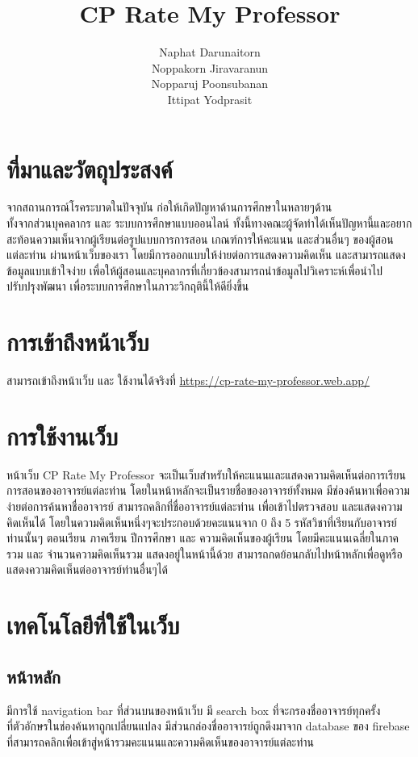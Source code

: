 \documentclass[17pt]{extarticle}
\title{\huge\textbf{CP Rate My Professor}}
\author{Naphat Darunaitorn\\ Noppakorn Jiravaranun\\ Nopparuj Poonsubanan\\ Ittipat Yodprasit}
\begin{document}
\maketitle
\pagebreak
\tableofcontents
\pagebreak
\section{ที่มาและวัตถุประสงค์}

จากสถานการณ์โรคระบาดในปัจจุบัน ก่อให้เกิดปัญหาด้านการศึกษาในหลายๆด้าน\\
ทั้งจากส่วนบุคคลากร และ ระบบการศึกษาแบบออนไลน์
ทั้งนี้ทางคณะผู้จัดทำได้เห็นปัญหานี้และอยากสะท้อนความเห็นจากผู้เรียนต่อรูปแบบการการสอน
เกณฑ์การให้คะแนน และส่วนอื่นๆ ของผู้สอนแต่ละท่าน ผ่านหน้าเว็บของเรา
โดยมีการออกแบบให้ง่ายต่อการแสดงความคิดเห็น และสามารถแสดงข้อมูลแบบเข้าใจง่าย
เพื่อให้ผู้สอนและบุคลากรที่เกี่ยวข้องสามารถนำข้อมูลไปวิเคราะห์เพื่อนำไปปรับปรุงพัฒนา
เพื่อระบบการศึกษาในภาวะวิกฤตินี้ให้ดียิ่งขึ้น

\section{การเข้าถึงหน้าเว็บ}
สามารถเข้าถึงหน้าเว็บ และ ใช้งานได้จริงที่ {\color{blue}\url{https://cp-rate-my-professor.web.app/}}

\section{การใช้งานเว็บ}
หน้าเว็บ CP Rate My Professor จะเป็นเว็บสำหรับให้คะแนนและแสดงความคิดเห็นต่อการเรียนการสอนของอาจารย์แต่ละท่าน
โดยในหน้าหลักจะเป็นรายชื่อของอาจารย์ทั้งหมด มีช่องค้นหาเพื่อความง่ายต่อการค้นหาชื่ออาจารย์
สามารถคลิกที่ชื่ออาจารย์แต่ละท่าน เพื่อเข้าไปตรวจสอบ และแสดงความคิดเห็นได้
โดยในความคิดเห็นหนึ่งๆจะประกอบด้วยคะแนนจาก 0 ถึง 5 รหัสวิชาที่เรียนกับอาจารย์ท่านนั้นๆ ตอนเรียน ภาคเรียน ปีการศึกษา และ ความคิดเห็นของผู้เรียน
โดยมีคะแนนเฉลี่ยในภาครวม และ จำนวนความคิดเห็นรวม แสดงอยู่ในหน้านี้ด้วย สามารถกดย้อนกลับไปหน้าหลักเพื่อดูหรือแสดงความคิดเห็นต่ออาจารย์ท่านอื่นๆได้

\pagebreak
\section{เทคโนโลยีที่ใช้ในเว็บ}
\subsection{หน้าหลัก}

มีการใช้ navigation bar ที่ส่วนบนของหน้าเว็บ มี search box ที่จะกรองชื่ออาจารย์ทุกครั้ง\\
ที่ตัวอักษรในช่องค้นหาถูกเปลี่ยนแปลง มีส่วนกล่องชื่ออาจารย์ถูกดึงมาจาก database ของ firebase
ที่สามารถคลิกเพื่อเข้าสู่หน้ารวมคะแนนและความคิดเห็นของอาจารย์แต่ละท่าน
\end{document}
